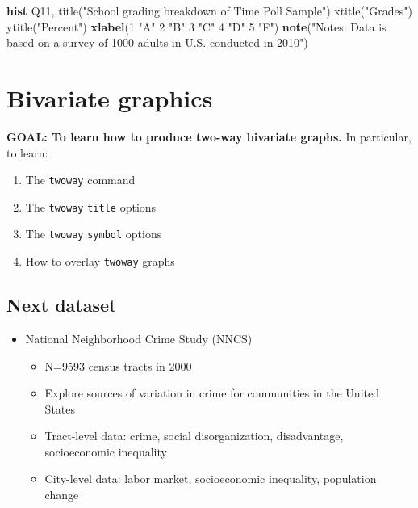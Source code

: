 \documentclass[
]{book}
\newenvironment{Shaded}{\begin{snugshade}}{\end{snugshade}}
\newcommand{\BaseNTok}[1]{\textcolor[rgb]{0.00,0.00,0.81}{#1}}
\newcommand{\KeywordTok}[1]{\textcolor[rgb]{0.13,0.29,0.53}{\textbf{#1}}}
\newcommand{\NormalTok}[1]{#1}
\newcommand{\StringTok}[1]{\textcolor[rgb]{0.31,0.60,0.02}{#1}}
\providecommand{\tightlist}{%
  \setlength{\itemsep}{0pt}\setlength{\parskip}{0pt}}
\begin{document}
\begin{alert}
\begin{Shaded}
\begin{Highlighting}[]
\KeywordTok{hist}\NormalTok{ Q11, }\BaseNTok{title}\NormalTok{(}\StringTok{"School grading breakdown of Time Poll Sample"}\NormalTok{) }\BaseNTok{xtitle}\NormalTok{(}\StringTok{"Grades"}\NormalTok{) }\BaseNTok{ytitle}\NormalTok{(}\StringTok{"Percent"}\NormalTok{) }\KeywordTok{xlabel}\NormalTok{(1 }\StringTok{"A"}\NormalTok{ 2 }\StringTok{"B"}\NormalTok{ 3 }\StringTok{"C"}\NormalTok{ 4 }\StringTok{"D"}\NormalTok{ 5 }\StringTok{"F"}\NormalTok{) }\KeywordTok{note}\NormalTok{(}\StringTok{"Notes: Data is based on a survey of 1000 adults in U.S. conducted in 2010"}\NormalTok{)}
\end{Highlighting}
\end{Shaded}

\end{alert}

\hypertarget{bivariate-graphics}{%
\section{Bivariate graphics}\label{bivariate-graphics}}

\begin{alert}

\textbf{GOAL: To learn how to produce two-way bivariate graphs.} In particular, to learn:

\begin{enumerate}
\def\labelenumi{\arabic{enumi}.}
\tightlist
\item
  The \texttt{twoway} command
\item
  The \texttt{twoway} \texttt{title} options
\item
  The \texttt{twoway} \texttt{symbol} options
\item
  How to overlay \texttt{twoway} graphs
\end{enumerate}

\end{alert}

\hypertarget{next-dataset}{%
\subsection{Next dataset}\label{next-dataset}}

\begin{itemize}
\tightlist
\item
  National Neighborhood Crime Study (NNCS)

  \begin{itemize}
  \tightlist
  \item
    N=9593 census tracts in 2000
  \item
    Explore sources of variation in crime for communities in the United States
  \item
    Tract-level data: crime, social disorganization, disadvantage, socioeconomic inequality
  \item
    City-level data: labor market, socioeconomic inequality, population change
  \end{itemize}
\end{itemize}
\end{document}
